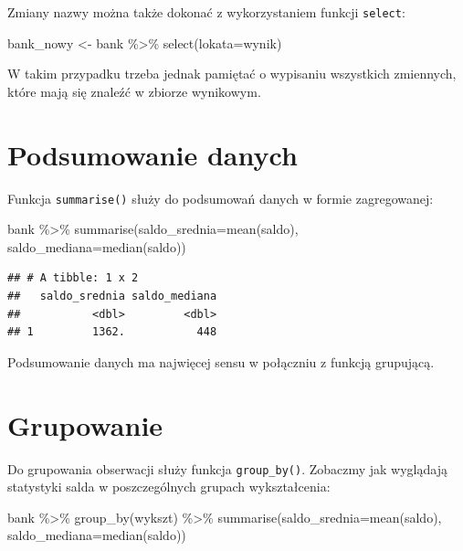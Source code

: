 \documentclass[
]{book}
\newenvironment{Shaded}{\begin{snugshade}}{\end{snugshade}}
\newcommand{\AttributeTok}[1]{\textcolor[rgb]{0.77,0.63,0.00}{#1}}
\newcommand{\FunctionTok}[1]{\textcolor[rgb]{0.00,0.00,0.00}{#1}}
\newcommand{\NormalTok}[1]{#1}
\newcommand{\OtherTok}[1]{\textcolor[rgb]{0.56,0.35,0.01}{#1}}
\newcommand{\SpecialCharTok}[1]{\textcolor[rgb]{0.00,0.00,0.00}{#1}}
\begin{document}
Zmiany nazwy można także dokonać z wykorzystaniem funkcji \texttt{select}:

\begin{Shaded}
\begin{Highlighting}[]
\NormalTok{bank\_nowy }\OtherTok{\textless{}{-}}\NormalTok{ bank }\SpecialCharTok{\%\textgreater{}\%}
  \FunctionTok{select}\NormalTok{(}\AttributeTok{lokata=}\NormalTok{wynik)}
\end{Highlighting}
\end{Shaded}

W takim przypadku trzeba jednak pamiętać o wypisaniu wszystkich zmiennych, które mają się znaleźć w zbiorze wynikowym.

\hypertarget{podsumowanie-danych}{%
\section{Podsumowanie danych}\label{podsumowanie-danych}}

Funkcja \texttt{summarise()} służy do podsumowań danych w formie zagregowanej:

\begin{Shaded}
\begin{Highlighting}[]
\NormalTok{bank }\SpecialCharTok{\%\textgreater{}\%}
  \FunctionTok{summarise}\NormalTok{(}\AttributeTok{saldo\_srednia=}\FunctionTok{mean}\NormalTok{(saldo),}
            \AttributeTok{saldo\_mediana=}\FunctionTok{median}\NormalTok{(saldo))}
\end{Highlighting}
\end{Shaded}

\begin{verbatim}
## # A tibble: 1 x 2
##   saldo_srednia saldo_mediana
##           <dbl>         <dbl>
## 1         1362.           448
\end{verbatim}

Podsumowanie danych ma najwięcej sensu w połączniu z funkcją grupującą.

\hypertarget{grupowanie}{%
\section{Grupowanie}\label{grupowanie}}

Do grupowania obserwacji służy funkcja \texttt{group\_by()}. Zobaczmy jak wyglądają statystyki salda w poszczególnych grupach wykształcenia:

\begin{Shaded}
\begin{Highlighting}[]
\NormalTok{bank }\SpecialCharTok{\%\textgreater{}\%}
  \FunctionTok{group\_by}\NormalTok{(wykszt) }\SpecialCharTok{\%\textgreater{}\%}
  \FunctionTok{summarise}\NormalTok{(}\AttributeTok{saldo\_srednia=}\FunctionTok{mean}\NormalTok{(saldo),}
            \AttributeTok{saldo\_mediana=}\FunctionTok{median}\NormalTok{(saldo))}
\end{Highlighting}
\end{Shaded}
\end{document}
